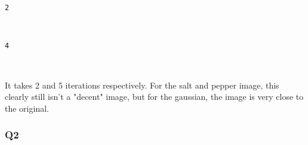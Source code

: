\documentclass[11pt]{article}
\begin{document}
    \begin{Verbatim}[commandchars=\\\{\}]
2

    \end{Verbatim}

    \begin{center}
    \end{center}
    { \hspace*{\fill} \\}
    
    \begin{Verbatim}[commandchars=\\\{\}]
4

    \end{Verbatim}

    \begin{center}
    \end{center}
    { \hspace*{\fill} \\}
    
    It takes 2 and 5 iterations respectively. For the salt and pepper image,
this clearly still isn't a "decent" image, but for the gaussian, the
image is very close to the original.

    \subsubsection{Q2}\label{q2}
\end{document}
